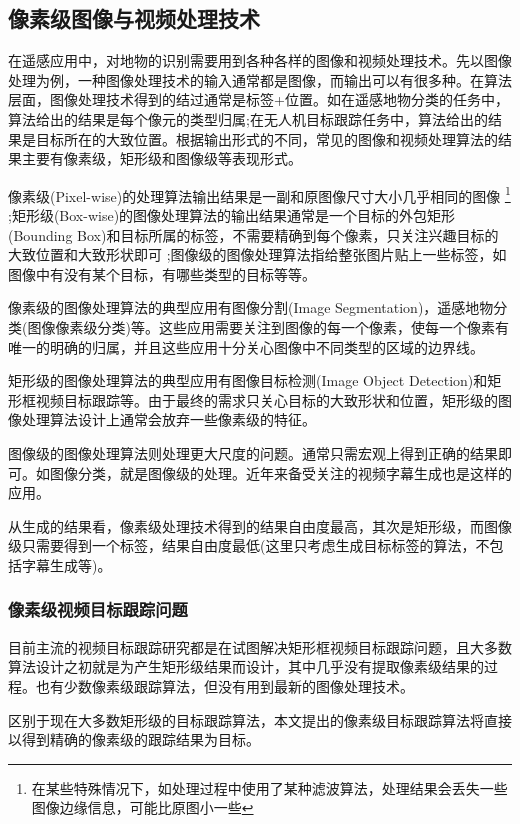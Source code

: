 \subsection{像素级图像与视频处理技术}
在遥感应用中，对地物的识别需要用到各种各样的图像和视频处理技术。先以图像处理为例，一种图像处理技术的输入通常都是图像，而输出可以有很多种。在算法层面，图像处理技术得到的结过通常是标签+位置。如在遥感地物分类的任务中，算法给出的结果是每个像元的类型归属;在无人机目标跟踪任务中，算法给出的结果是目标所在的大致位置。根据输出形式的不同，常见的图像和视频处理算法的结果主要有像素级，矩形级和图像级等表现形式。
\par
像素级(Pixel-wise)的处理算法输出结果是一副和原图像尺寸大小几乎相同的图像
\footnote{在某些特殊情况下，如处理过程中使用了某种滤波算法，处理结果会丢失一些图像边缘信息，可能比原图小一些}
;矩形级(Box-wise)的图像处理算法的输出结果通常是一个目标的外包矩形(Bounding Box)和目标所属的标签，不需要精确到每个像素，只关注兴趣目标的大致位置和大致形状即可
;图像级的图像处理算法指给整张图片贴上一些标签，如图像中有没有某个目标，有哪些类型的目标等等。
\par
像素级的图像处理算法的典型应用有图像分割(Image Segmentation)，遥感地物分类(图像像素级分类)等。这些应用需要关注到图像的每一个像素，使每一个像素有唯一的明确的归属，并且这些应用十分关心图像中不同类型的区域的边界线。
\par
矩形级的图像处理算法的典型应用有图像目标检测(Image Object Detection)和矩形框视频目标跟踪等。由于最终的需求只关心目标的大致形状和位置，矩形级的图像处理算法设计上通常会放弃一些像素级的特征。
\par
图像级的图像处理算法则处理更大尺度的问题。通常只需宏观上得到正确的结果即可。如图像分类\supercite{imagenet_cvpr09}，就是图像级的处理。近年来备受关注的视频字幕生成\supercite{aswin2019nlp}也是这样的应用。

\par
从生成的结果看，像素级处理技术得到的结果自由度最高，其次是矩形级，而图像级只需要得到一个标签，结果自由度最低(这里只考虑生成目标标签的算法，不包括字幕生成等)。

\subsubsection{像素级视频目标跟踪问题}
目前主流的视频目标跟踪研究都是在试图解决矩形框视频目标跟踪问题，且大多数算法设计之初就是为产生矩形级结果而设计，其中几乎没有提取像素级结果的过程。也有少数像素级跟踪算法，但没有用到最新的图像处理技术。
\par
区别于现在大多数矩形级的目标跟踪算法，本文提出的像素级目标跟踪算法将直接以得到精确的像素级的跟踪结果为目标。

